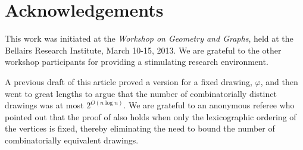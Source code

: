 \documentclass{patmorin}
\renewcommand{\note}[1]{}
\begin{document}
\section*{Acknowledgements}

This work was initiated at the \emph{Workshop on Geometry and Graphs},
held at the Bellairs Research Institute, March 10-15, 2013.  We are
grateful to the other workshop participants for providing a stimulating
research environment.

A previous draft of this article proved a version  for a
fixed drawing, $\varphi$, and then went to great lengths to argue that the
number of combinatorially distinct drawings was at most $2^{O(n\log n)}$.
We are grateful to an anonymous referee who pointed out that the proof
of  also holds when only the lexicographic ordering
of the vertices is fixed, thereby eliminating the need to bound the number
of combinatorially equivalent drawings.




\end{document}
